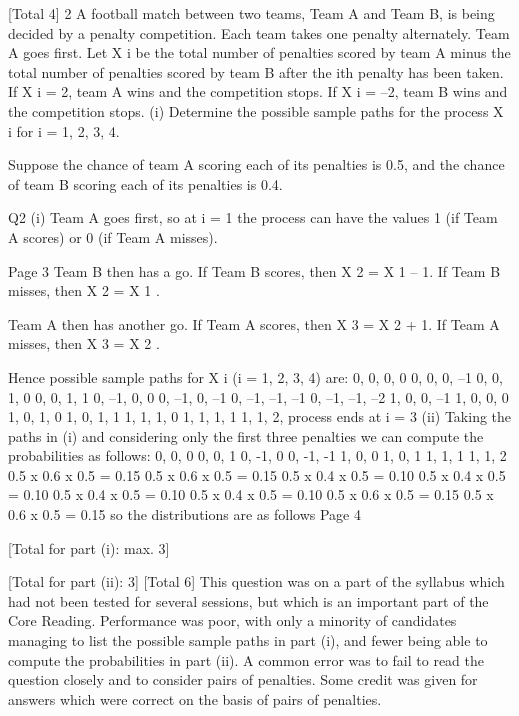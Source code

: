 \documentclass[a4paper,12pt]{article}
\begin{document}
[Total 4]
2
A football match between two teams, Team A and Team B, is being decided by a
penalty competition. Each team takes one penalty alternately. Team A goes first.
Let X i be the total number of penalties scored by team A minus the total number of
penalties scored by team B after the ith penalty has been taken. If X i = 2, team A wins
and the competition stops. If X i = –2, team B wins and the competition stops.
(i)
Determine the possible sample paths for the process X i for i = 1, 2, 3, 4.

Suppose the chance of team A scoring each of its penalties is 0.5, and the chance of
team B scoring each of its penalties is 0.4.


Q2
(i)
Team A goes first, so at i = 1 the process can have the values 1 (if Team A
scores) or 0 (if Team A misses).

Page 3
Team B then has a go. If Team B scores, then X 2 = X 1 – 1.
If Team B misses, then X 2 = X 1 .

Team A then has another go. If Team A scores, then X 3 = X 2 + 1.
If Team A misses, then X 3 = X 2 .

Hence possible sample paths for X i (i = 1, 2, 3, 4) are:
0, 0, 0, 0
0, 0, 0, –1
0, 0, 1, 0
0, 0, 1, 1
0, –1, 0, 0
0, –1, 0, –1
0, –1, –1, –1
0, –1, –1, –2
1, 0, 0, –1
1, 0, 0, 0
1, 0, 1, 0
1, 0, 1, 1
1, 1, 1, 0
1, 1, 1, 1
1, 1, 2, process ends at i = 3
(ii)
Taking the paths in (i) and considering only the first three penalties we can
compute the probabilities as follows:
0, 0, 0
0, 0, 1
0, -1, 0
0, -1, -1
1, 0, 0
1, 0, 1
1, 1, 1
1, 1, 2
0.5 x 0.6 x 0.5 = 0.15
0.5 x 0.6 x 0.5 = 0.15
0.5 x 0.4 x 0.5 = 0.10
0.5 x 0.4 x 0.5 = 0.10
0.5 x 0.4 x 0.5 = 0.10
0.5 x 0.4 x 0.5 = 0.10
0.5 x 0.6 x 0.5 = 0.15
0.5 x 0.6 x 0.5 = 0.15
so the distributions are as follows
Page 4

[Total for part (i): max. 3]


[Total for part (ii): 3]
[Total 6]
This question was on a part of the syllabus which had not been
tested for several sessions, but which is an important part of the
Core Reading. Performance was poor, with only a minority of
candidates managing to list the possible sample paths in part (i),
and fewer being able to compute the probabilities in part (ii). A
common error was to fail to read the question closely and to
consider pairs of penalties. Some credit was given for answers
which were correct on the basis of pairs of penalties.
\end{document}
